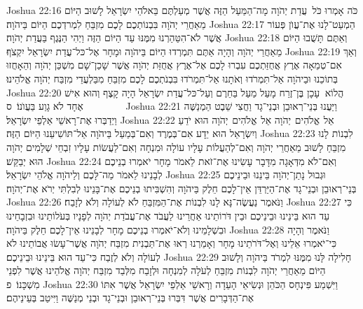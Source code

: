 Joshua 22:16	כֹּה אָמְרוּ כֹּל  עֲדַת יְהֹוָה מָה־הַמַּעַל הַזֶּה אֲשֶׁר מְעַלְתֶּם בֵּאלֹהֵי יִשְׂרָאֵל לָשׁוּב הַיּוֹם מֵאַחֲרֵי יְהֹוָה בִּבְנוֹתְכֶם לָכֶם מִזְבֵּחַ לִמְרדְכֶם הַיּוֹם בַּיהֹוָה׃
Joshua 22:17	הַמְעַט־לָנוּ אֶת־עֲוֺן פְּעוֹר אֲשֶׁר לֹא־הִטַּהַרְנוּ מִמֶּנּוּ עַד הַיּוֹם הַזֶּה וַיְהִי הַנֶּגֶף בַּעֲדַת יְהֹוָה׃
Joshua 22:18	וְאַתֶּם תָּשֻׁבוּ הַיּוֹם מֵאַחֲרֵי יְהֹוָה וְהָיָה אַתֶּם תִּמְרְדוּ הַיּוֹם בַּיהֹוָה וּמָחָר אֶל־כּל־עֲדַת יִשְׂרָאֵל יִקְצֹף׃
Joshua 22:19	וְאַךְ אִם־טְמֵאָה אֶרֶץ אֲחֻזַּתְכֶם עִבְרוּ לָכֶם אֶל־אֶרֶץ אֲחֻזַּת יְהֹוָה אֲשֶׁר שָׁכַן־שָׁם מִשְׁכַּן יְהֹוָה וְהֵאָחֲזוּ בְּתוֹכֵנוּ וּבַיהֹוָה אַל־תִּמְרֹדוּ וְאֹתָנוּ אַל־תִּמְרֹדוּ בִּבְנֹתְכֶם לָכֶם מִזְבֵּחַ מִבַּלְעֲדֵי מִזְבַּח יְהֹוָה אֱלֹהֵינוּ׃
Joshua 22:20	הֲלוֹא  עָכָן בֶּן־זֶרַח מָעַל מַעַל בַּחֵרֶם וְעַל־כּל־עֲדַת יִשְׂרָאֵל הָיָה קָצֶף וְהוּא אִישׁ אֶחָד לֹא גָוַע בַּעֲוֺנוֹ׃ {ס}        
Joshua 22:21	וַיַּעֲנוּ בְּנֵי־רְאוּבֵן וּבְנֵי־גָד וַחֲצִי שֵׁבֶט הַמְנַשֶּׁה וַיְדַבְּרוּ אֶת־רָאשֵׁי אַלְפֵי יִשְׂרָאֵל׃
Joshua 22:22	אֵל  אֱלֹהִים  יְהֹוָה אֵל  אֱלֹהִים  יְהֹוָה הוּא יֹדֵעַ וְיִשְׂרָאֵל הוּא יֵדָע אִם־בְּמֶרֶד וְאִם־בְּמַעַל בַּיהֹוָה אַל־תּוֹשִׁיעֵנוּ הַיּוֹם הַזֶּה׃
Joshua 22:23	לִבְנוֹת לָנוּ מִזְבֵּחַ לָשׁוּב מֵאַחֲרֵי יְהֹוָה וְאִם־לְהַעֲלוֹת עָלָיו עוֹלָה וּמִנְחָה וְאִם־לַעֲשׂוֹת עָלָיו זִבְחֵי שְׁלָמִים יְהֹוָה הוּא יְבַקֵּשׁ׃
Joshua 22:24	וְאִם־לֹא מִדְּאָגָה מִדָּבָר עָשִׂינוּ אֶת־זֹאת לֵאמֹר מָחָר יֹאמְרוּ בְנֵיכֶם לְבָנֵינוּ לֵאמֹר מַה־לָּכֶם וְלַיהֹוָה אֱלֹהֵי יִשְׂרָאֵל׃
Joshua 22:25	וּגְבוּל נָתַן־יְהֹוָה בֵּינֵנוּ וּבֵינֵיכֶם בְּנֵי־רְאוּבֵן וּבְנֵי־גָד אֶת־הַיַּרְדֵּן אֵין־לָכֶם חֵלֶק בַּיהֹוָה וְהִשְׁבִּיתוּ בְנֵיכֶם אֶת־בָּנֵינוּ לְבִלְתִּי יְרֹא אֶת־יְהֹוָה׃
Joshua 22:26	וַנֹּאמֶר נַעֲשֶׂה־נָּא לָנוּ לִבְנוֹת אֶת־הַמִּזְבֵּחַ לֹא לְעוֹלָה וְלֹא לְזָבַח׃
Joshua 22:27	כִּי עֵד הוּא בֵּינֵינוּ וּבֵינֵיכֶם וּבֵין דֹּרוֹתֵינוּ אַחֲרֵינוּ לַעֲבֹד אֶת־עֲבֹדַת יְהֹוָה לְפָנָיו בְּעֹלוֹתֵינוּ וּבִזְבָחֵינוּ וּבִשְׁלָמֵינוּ וְלֹא־יֹאמְרוּ בְנֵיכֶם מָחָר לְבָנֵינוּ אֵין־לָכֶם חֵלֶק בַּיהֹוָה׃
Joshua 22:28	וַנֹּאמֶר וְהָיָה כִּי־יֹאמְרוּ אֵלֵינוּ וְאֶל־דֹּרֹתֵינוּ מָחָר וְאָמַרְנוּ רְאוּ אֶת־תַּבְנִית מִזְבַּח יְהֹוָה אֲשֶׁר־עָשׂוּ אֲבוֹתֵינוּ לֹא לְעוֹלָה וְלֹא לְזֶבַח כִּי־עֵד הוּא בֵּינֵינוּ וּבֵינֵיכֶם׃
Joshua 22:29	חָלִילָה לָּנוּ מִמֶּנּוּ לִמְרֹד בַּיהֹוָה וְלָשׁוּב הַיּוֹם מֵאַחֲרֵי יְהֹוָה לִבְנוֹת מִזְבֵּחַ לְעֹלָה לְמִנְחָה וּלְזָבַח מִלְּבַד מִזְבַּח יְהֹוָה אֱלֹהֵינוּ אֲשֶׁר לִפְנֵי מִשְׁכָּנוֹ׃ {פ}
Joshua 22:30	וַיִּשְׁמַע פִּינְחָס הַכֹּהֵן וּנְשִׂיאֵי הָעֵדָה וְרָאשֵׁי אַלְפֵי יִשְׂרָאֵל אֲשֶׁר אִתּוֹ אֶת־הַדְּבָרִים אֲשֶׁר דִּבְּרוּ בְּנֵי־רְאוּבֵן וּבְנֵי־גָד וּבְנֵי מְנַשֶּׁה וַיִּיטַב בְּעֵינֵיהֶם׃
